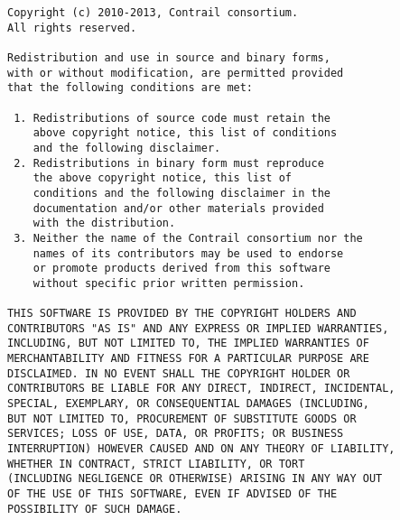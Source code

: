 \documentclass[10pt]{article}
\begin{document}
\begin{verbatim}
Copyright (c) 2010-2013, Contrail consortium.
All rights reserved.

Redistribution and use in source and binary forms, 
with or without modification, are permitted provided
that the following conditions are met:

 1. Redistributions of source code must retain the
    above copyright notice, this list of conditions
    and the following disclaimer.
 2. Redistributions in binary form must reproduce
    the above copyright notice, this list of 
    conditions and the following disclaimer in the
    documentation and/or other materials provided
    with the distribution.
 3. Neither the name of the Contrail consortium nor the
    names of its contributors may be used to endorse
    or promote products derived from this software 
    without specific prior written permission.

THIS SOFTWARE IS PROVIDED BY THE COPYRIGHT HOLDERS AND
CONTRIBUTORS "AS IS" AND ANY EXPRESS OR IMPLIED WARRANTIES,
INCLUDING, BUT NOT LIMITED TO, THE IMPLIED WARRANTIES OF
MERCHANTABILITY AND FITNESS FOR A PARTICULAR PURPOSE ARE
DISCLAIMED. IN NO EVENT SHALL THE COPYRIGHT HOLDER OR
CONTRIBUTORS BE LIABLE FOR ANY DIRECT, INDIRECT, INCIDENTAL,
SPECIAL, EXEMPLARY, OR CONSEQUENTIAL DAMAGES (INCLUDING, 
BUT NOT LIMITED TO, PROCUREMENT OF SUBSTITUTE GOODS OR 
SERVICES; LOSS OF USE, DATA, OR PROFITS; OR BUSINESS 
INTERRUPTION) HOWEVER CAUSED AND ON ANY THEORY OF LIABILITY,
WHETHER IN CONTRACT, STRICT LIABILITY, OR TORT
(INCLUDING NEGLIGENCE OR OTHERWISE) ARISING IN ANY WAY OUT
OF THE USE OF THIS SOFTWARE, EVEN IF ADVISED OF THE
POSSIBILITY OF SUCH DAMAGE.
\end{verbatim}
\end{document}
